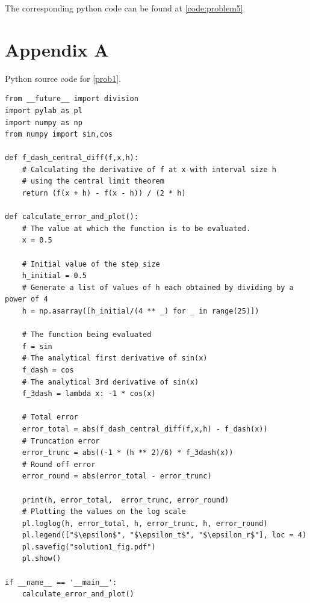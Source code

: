 \documentclass[a4paper,11pt]{article}
\begin{document}
The corresponding python code can be found at \ref{code:problem5}

\clearpage
\appendix

\section{Appendix A}\label{code:problem1}
Python source code for \ref{prob1}.
{\footnotesize
\begin{lstlisting}
from __future__ import division
import pylab as pl
import numpy as np
from numpy import sin,cos

def f_dash_central_diff(f,x,h):
	# Calculating the derivative of f at x with interval size h
	# using the central limit theorem
    return (f(x + h) - f(x - h)) / (2 * h)

def calculate_error_and_plot():
	# The value at which the function is to be evaluated.
    x = 0.5
    
    # Initial value of the step size
    h_initial = 0.5
    # Generate a list of values of h each obtained by dividing by a power of 4
    h = np.asarray([h_initial/(4 ** _) for _ in range(25)])

    # The function being evaluated
    f = sin
    # The analytical first derivative of sin(x)
    f_dash = cos
    # The analytical 3rd derivative of sin(x)
    f_3dash = lambda x: -1 * cos(x)

    # Total error
    error_total = abs(f_dash_central_diff(f,x,h) - f_dash(x))
    # Truncation error
    error_trunc = abs((-1 * (h ** 2)/6) * f_3dash(x))
    # Round off error
    error_round = abs(error_total - error_trunc)

    print(h, error_total,  error_trunc, error_round)
    # Plotting the values on the log scale
    pl.loglog(h, error_total, h, error_trunc, h, error_round)
    pl.legend(["$\epsilon$", "$\epsilon_t$", "$\epsilon_r$"], loc = 4)
    pl.savefig("solution1_fig.pdf")
    pl.show()

if __name__ == '__main__':
    calculate_error_and_plot()
\end{lstlisting}
}



\clearpage
\end{document}
